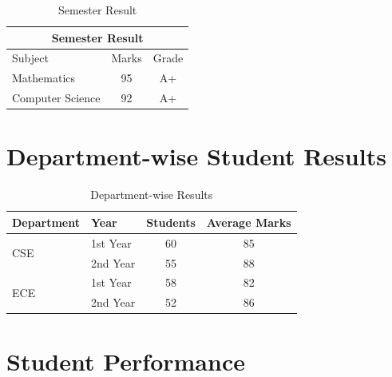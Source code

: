 \documentclass{article}
\begin{document}
	\begin{table}[h]
		\centering
		
		\caption{Semester Result}
		\label{tab:semester}
		
		\begin{tabular}{lcc}
			\toprule
			
			\multicolumn{3}{c}{\textbf{Semester Result}} \\
			
			\midrule
			
			Subject & Marks & Grade \\
			
			\midrule
			
			Mathematics & 95 & A+ \\
			Computer Science & 92 & A+ \\
			
			\bottomrule
		\end{tabular}
		
	\end{table}

	
	\section{Department-wise Student Results}
	
	\begin{table}[h]
		\centering
		
		\caption{Department-wise Results}
		\label{tab:department}
		
		\begin{tabular}{l l c c}
			\toprule
			Department & Year & Students & Average Marks \\
			\midrule
			
			\multirow{2}{*}{CSE}
			& 1st Year & 60 & 85 \\
			& 2nd Year & 55 & 88 \\
			\midrule
			
			\multirow{2}{*}{ECE}
			& 1st Year & 58 & 82 \\
			& 2nd Year & 52 & 86 \\
			
			\bottomrule
		\end{tabular}
		
	\end{table}
	\section{Student Performance}
	
\end{document}
